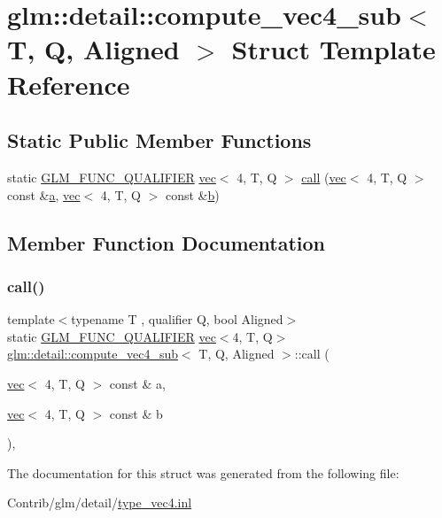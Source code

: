 \hypertarget{structglm_1_1detail_1_1compute__vec4__sub}{}\section{glm\+:\+:detail\+:\+:compute\+\_\+vec4\+\_\+sub$<$ T, Q, Aligned $>$ Struct Template Reference}
\label{structglm_1_1detail_1_1compute__vec4__sub}
\subsection*{Static Public Member Functions}
\begin{DoxyCompactItemize}
\item 
static \mbox{\hyperlink{setup_8hpp_a33fdea6f91c5f834105f7415e2a64407}{G\+L\+M\+\_\+\+F\+U\+N\+C\+\_\+\+Q\+U\+A\+L\+I\+F\+I\+ER}} \mbox{\hyperlink{structglm_1_1vec}{vec}}$<$ 4, T, Q $>$ \mbox{\hyperlink{structglm_1_1detail_1_1compute__vec4__sub_a3f6c03dd3f8dcb8d955a41e8f150094c}{call}} (\mbox{\hyperlink{structglm_1_1vec}{vec}}$<$ 4, T, Q $>$ const \&\mbox{\hyperlink{_s_d_l__opengl__glext_8h_a3309789fc188587d666cda5ece79cf82}{a}}, \mbox{\hyperlink{structglm_1_1vec}{vec}}$<$ 4, T, Q $>$ const \&\mbox{\hyperlink{_s_d_l__opengl__glext_8h_a0f71581a41fd2264c8944126dabbd010}{b}})
\end{DoxyCompactItemize}


\subsection{Member Function Documentation}
\mbox{\label{structglm_1_1detail_1_1compute__vec4__sub_a3f6c03dd3f8dcb8d955a41e8f150094c}} 
\subsubsection{\texorpdfstring{call()}{call()}}
{\footnotesize\ttfamily template$<$typename T , qualifier Q, bool Aligned$>$ \\
static \mbox{\hyperlink{setup_8hpp_a33fdea6f91c5f834105f7415e2a64407}{G\+L\+M\+\_\+\+F\+U\+N\+C\+\_\+\+Q\+U\+A\+L\+I\+F\+I\+ER}} \mbox{\hyperlink{structglm_1_1vec}{vec}}$<$4, T, Q$>$ \mbox{\hyperlink{structglm_1_1detail_1_1compute__vec4__sub}{glm\+::detail\+::compute\+\_\+vec4\+\_\+sub}}$<$ T, Q, Aligned $>$\+::call (\begin{DoxyParamCaption}\item[{\mbox{\hyperlink{structglm_1_1vec}{vec}}$<$ 4, T, Q $>$ const \&}]{a,  }\item[{\mbox{\hyperlink{structglm_1_1vec}{vec}}$<$ 4, T, Q $>$ const \&}]{b }\end{DoxyParamCaption})\hspace{0.3cm}{\ttfamily [inline]}, {\ttfamily [static]}}



The documentation for this struct was generated from the following file\+:\begin{DoxyCompactItemize}
\item 
Contrib/glm/detail/\mbox{\hyperlink{type__vec4_8inl}{type\+\_\+vec4.\+inl}}\end{DoxyCompactItemize}
